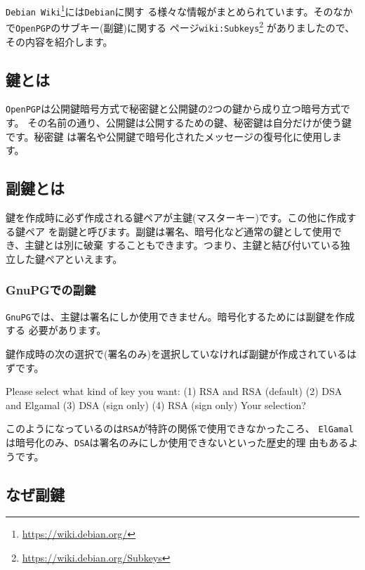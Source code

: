 \documentclass[mingoth,a4paper]{jsarticle}
\begin{document}

{\tt Debian Wiki}\footnote{\url{https://wiki.debian.org/}}には{\tt Debian}に関す
る様々な情報がまとめられています。そのなかで{\tt OpenPGP}のサブキー(副鍵)に関する
ページ{\tt wiki:Subkeys}\footnote{\url{https://wiki.debian.org/Subkeys}}
がありましたので、その内容を紹介します。

\subsection{鍵とは}

{\tt OpenPGP}は公開鍵暗号方式で秘密鍵と公開鍵の2つの鍵から成り立つ暗号方式です。
その名前の通り、公開鍵は公開するための鍵、秘密鍵は自分だけが使う鍵です。秘密鍵
は署名や公開鍵で暗号化されたメッセージの復号化に使用します。

\subsection{副鍵とは}

鍵を作成時に必ず作成される鍵ペアが主鍵(マスターキー)です。この他に作成する鍵ペア
を副鍵と呼びます。副鍵は署名、暗号化など通常の鍵として使用でき、主鍵とは別に破棄
することもできます。つまり、主鍵と結び付いている独立した鍵ペアといえます。

\subsubsection{GnuPGでの副鍵}

{\tt GnuPG}では、主鍵は署名にしか使用できません。暗号化するためには副鍵を作成する
必要があります。

鍵作成時の次の選択で(署名のみ)を選択していなければ副鍵が作成されているはずです。

\begin{commandline}
Please select what kind of key you want:
   (1) RSA and RSA (default)
   (2) DSA and Elgamal
   (3) DSA (sign only)
   (4) RSA (sign only)
Your selection?
\end{commandline}

このようになっているのは{\tt RSA}が特許の関係で使用できなかったころ、
{\tt ElGamal}は暗号化のみ、{\tt DSA}は署名のみにしか使用できないといった歴史的理
由もあるようです。


\subsection{なぜ副鍵}
\end{document}
